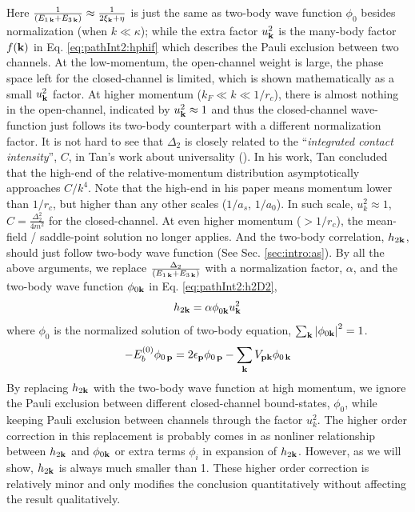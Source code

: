 Here $\frac{1}{(E_{1\,\mathbf{k}}+E_{3\,\mathbf{k}})}\approx\frac{1}{2\xi_{\mathbf{k}}+\eta}$ is just the same as two-body wave function $\phi_{0}$  besides normalization (when $k\ll\kappa$); while the extra factor $u_{\mathbf{k}}^{2}$ is the many-body factor $f(\mathbf{k})$ in Eq. \ref{eq:pathInt2:hphif} which describes the Pauli exclusion between two channels.  At the low-momentum, the open-channel weight is large, the phase space left for the closed-channel is limited, which is shown mathematically as a small $u_{\mathbf{k}}^{2}$ factor.   At higher momentum ($k_{F}\ll{k}\ll1/r_{c}$),  there is almost nothing in the open-channel,  indicated by $u_{\mathbf{k}}^{2}\approx1$ and thus the closed-channel wave-function just follows its two-body counterpart with a different normalization factor.   It is not hard to see that $\Delta_{2}$ is closely related to the ``\emph{integrated contact intensity}'', $C$, in Tan's work about universality (\cite{Tan2008-1,Tan2008-2}).  In his work, Tan concluded that  the high-end of the relative-momentum distribution asymptotically approaches  $C/k^{4}$.  Note that the high-end in his paper means momentum lower than $1/r_{c}$, but higher than any other scales ($1/a_{s}$, $1/a_{0}$).  In such scale, $u_{k}^2\approx1$, %
$C=\frac{\Delta_{2}^{2}}{4m^{2}}$ for the closed-channel.   
At even higher momentum ($>1/r_{c}$), the mean-field / saddle-point solution no longer applies.  And the two-body correlation, $h_{2\mathbf{k}}$, should just follow two-body wave function (See Sec. \ref{sec:intro:as}).  By all the above arguments, we replace $\frac{\Delta_{2}}{(E_{1\,\mathbf{k}}+E_{3\,\mathbf{k}})}$ with a normalization factor, $\alpha$, and the two-body wave function $\phi_{0\mathbf{k}}$ in Eq. \ref{eq:pathInt2:h2D2},
\begin{equation}\label{eq:pathInt2:hphi}
h_{2\mathbf{k}}=\alpha\phi^{}_{0\mathbf{k}}u_{\mathbf{k}}^{2}
\end{equation}
where $\phi_{0}$ is the normalized  solution of  two-body \sch equation, $\sum_{\mathbf{k}}\left\lvert{\phi_{0\ensuremath{\mathbf{k}}}}\right\rvert^{2}=1$.
\begin{equation}\label{eq:pathInt2:phi}
-E_{b}^{(0)}\phi_{0\,\mathbf{p}}=2\epsilon_{\mathbf{p}}\phi_{0\,\mathbf{p}}-\sum_{\mathbf{k}}V_{\mathbf{p}\mathbf{k}} \phi_{0\,\mathbf{k}}
\end{equation}
By replacing $h_{2\mathbf{k}}$ with the two-body wave function at high momentum, we ignore the Pauli exclusion between different closed-channel bound-states, $\phi_{0}$, while keeping Pauli exclusion between channels through the factor $u_{k}^{2}$.  The higher order correction in this replacement is probably comes in as nonliner relationship between $h_{2\mathbf{k}}$ and $\phi_{0\mathbf{k}}$ or extra terms $\phi_{i}$ in expansion of $h_{2\mathbf{k}}$. However, as we will show, $h_{2\mathbf{k}}$ is always  much smaller than 1. These higher order correction is relatively minor and only modifies  the conclusion quantitatively without affecting the result qualitatively. 
